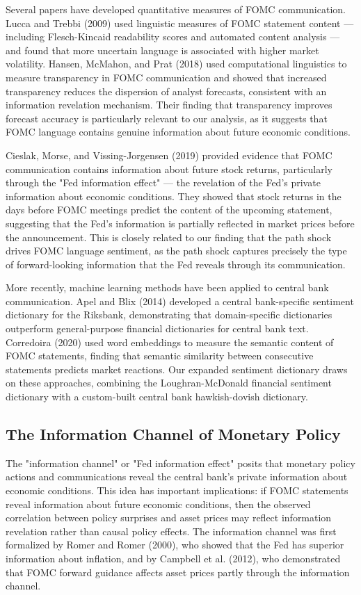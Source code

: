 \documentclass[12pt]{article}
\begin{document}
Several papers have developed quantitative measures of FOMC communication. Lucca and Trebbi (2009) used linguistic measures of FOMC statement content --- including Flesch-Kincaid readability scores and automated content analysis --- and found that more uncertain language is associated with higher market volatility. Hansen, McMahon, and Prat (2018) used computational linguistics to measure transparency in FOMC communication and showed that increased transparency reduces the dispersion of analyst forecasts, consistent with an information revelation mechanism. Their finding that transparency improves forecast accuracy is particularly relevant to our analysis, as it suggests that FOMC language contains genuine information about future economic conditions.

Cieslak, Morse, and Vissing-Jorgensen (2019) provided evidence that FOMC communication contains information about future stock returns, particularly through the "Fed information effect" --- the revelation of the Fed's private information about economic conditions. They showed that stock returns in the days before FOMC meetings predict the content of the upcoming statement, suggesting that the Fed's information is partially reflected in market prices before the announcement. This is closely related to our finding that the path shock drives FOMC language sentiment, as the path shock captures precisely the type of forward-looking information that the Fed reveals through its communication.

More recently, machine learning methods have been applied to central bank communication. Apel and Blix (2014) developed a central bank-specific sentiment dictionary for the Riksbank, demonstrating that domain-specific dictionaries outperform general-purpose financial dictionaries for central bank text. Corredoira (2020) used word embeddings to measure the semantic content of FOMC statements, finding that semantic similarity between consecutive statements predicts market reactions. Our expanded sentiment dictionary draws on these approaches, combining the Loughran-McDonald financial sentiment dictionary with a custom-built central bank hawkish-dovish dictionary.

\subsection{The Information Channel of Monetary Policy}

The "information channel" or "Fed information effect" posits that monetary policy actions and communications reveal the central bank's private information about economic conditions. This idea has important implications: if FOMC statements reveal information about future economic conditions, then the observed correlation between policy surprises and asset prices may reflect information revelation rather than causal policy effects. The information channel was first formalized by Romer and Romer (2000), who showed that the Fed has superior information about inflation, and by Campbell et al. (2012), who demonstrated that FOMC forward guidance affects asset prices partly through the information channel.
\end{document}
